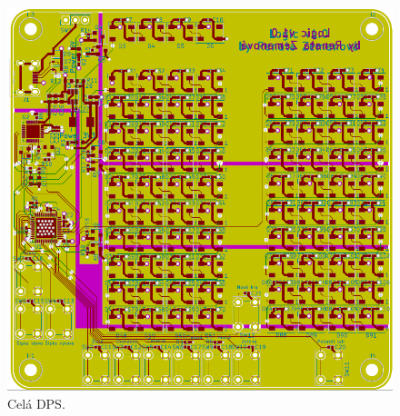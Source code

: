   \begin{figure}[!h]
    \begin{center}
      \includegraphics[scale=0.9]{prilohy/Verze1_DPS_cela.png}
    \end{center}
    \caption[Celá DPS]{Celá DPS.}
  \end{figure}



%
%
%







